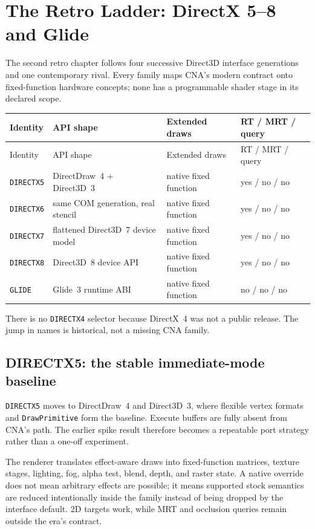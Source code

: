 \chapter{The Retro Ladder: DirectX 5--8 and Glide}
\label{ch:retro-ladder}

The second retro chapter follows four successive Direct3D interface generations and one
contemporary rival.  Every family maps CNA's modern contract onto fixed-function hardware
concepts; none has a programmable shader stage in its declared scope.

\begin{longtable}{p{}p{}p{}p{}}
\toprule
Identity & API shape & Extended draws & RT / MRT / query \\
\midrule
\endfirsthead
\toprule
Identity & API shape & Extended draws & RT / MRT / query \\
\midrule
\endhead
\texttt{DIRECTX5} & DirectDraw~4 + Direct3D~3 & native fixed function & yes / no / no \\
\texttt{DIRECTX6} & same COM generation, real stencil & native fixed function & yes / no / no \\
\texttt{DIRECTX7} & flattened Direct3D~7 device model & native fixed function & yes / no / no \\
\texttt{DIRECTX8} & Direct3D~8 device API & native fixed function & yes / no / no \\
\texttt{GLIDE} & Glide~3 runtime ABI & native fixed function & no / no / no \\
\bottomrule
\end{longtable}

There is no \texttt{DIRECTX4} selector because DirectX~4 was not a public release.  The jump
in names is historical, not a missing CNA family.

\section{DIRECTX5: the stable immediate-mode baseline}

\texttt{DIRECTX5} moves to DirectDraw~4 and Direct3D~3, where flexible vertex formats and
\texttt{DrawPrimitive} form the baseline.  Execute buffers are fully absent from CNA's path.
The earlier spike result therefore becomes a repeatable port strategy rather than a one-off
experiment.

The renderer translates effect-aware draws into fixed-function matrices, texture stages,
lighting, fog, alpha test, blend, depth, and raster state.  A native override does not mean
arbitrary effects are possible; it means supported stock semantics are reduced intentionally
inside the family instead of being dropped by the interface default.  2D targets work, while
MRT and occlusion queries remain outside the era's contract.

